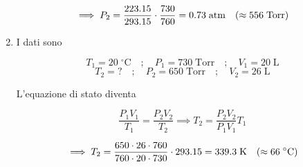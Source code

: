 \begin{soluzione}
\begin{enumerate}
    $$\implies
    P_2=\frac{223.15}{293.15}\cdot \frac{730}{760}
    =0.73 \; \rm atm
    \quad(\approx 556 \; Torr)$$
    \item I dati sono

    $$T_1=20 \; ^{\circ}\text{C}
    \quad;\quad
    P_1=730 \; \text{Torr}
    \quad;\quad
    V_1=20 \; \text{L}$$
    $$T_2=?
    \quad;\quad
    P_2=650 \; \text{Torr}
    \quad;\quad
    V_2=26 \; \text{L}$$
    
    L'equazione di stato diventa 
    
    $$\frac{P_1V_1}{T_1}=\frac{P_2V_2}{T_2}
    \implies
    T_2=\frac{P_2V_2}{P_1V_1}T_1$$
    
    $$\implies
    T_2=\frac{650 \cdot 26 \cdot 760}{760 \cdot 20 \cdot 730}\cdot 293.15
    =339.3 \; \rm K
    \quad(\approx 66 \; \rm ^{\circ} C)$$
\end{enumerate}
\end{soluzione}

\newpage

